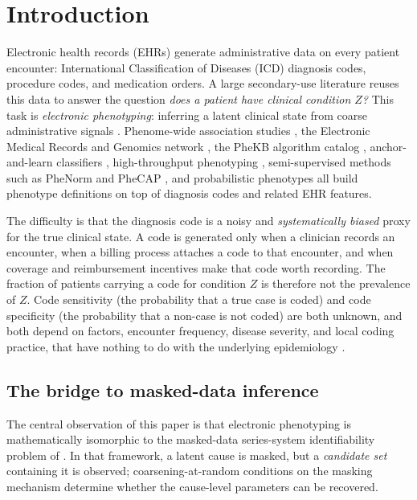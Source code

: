 \section{Introduction}
\label{sec:intro}

Electronic health records (EHRs) generate administrative data on every
patient encounter: International Classification of Diseases (ICD)
diagnosis codes, procedure codes, and medication orders. A large
secondary-use literature reuses this data to answer the question
\emph{does a patient have clinical condition $Z$?} This task is
\emph{electronic phenotyping}: inferring a latent clinical state from
coarse administrative signals \citep{banda2018phenotyping,
hripcsak2013correlating}. Phenome-wide association studies
\citep{denny2010phewas}, the Electronic Medical Records and Genomics
network \citep{gottesman2013emerge,newton2013validation}, the PheKB
algorithm catalog \citep{kirby2016phekb}, anchor-and-learn classifiers
\citep{halpern2016anchor}, high-throughput phenotyping
\citep{liao2015highthroughput}, semi-supervised methods such as
PheNorm \citep{yu2018phenorm} and PheCAP \citep{zhang2019phecap}, and
probabilistic phenotypes \citep{pivovarov2015learning} all build
phenotype definitions on top of diagnosis codes and related EHR
features.

The difficulty is that the diagnosis code is a noisy and
\emph{systematically biased} proxy for the true clinical state. A code
is generated only when a clinician records an encounter, when a billing
process attaches a code to that encounter, and when coverage and
reimbursement incentives make that code worth recording. The fraction
of patients carrying a code for condition $Z$ is therefore not the
prevalence of $Z$. Code sensitivity (the probability that a true case
is coded) and code specificity (the probability that a non-case is not
coded) are both unknown, and both depend on factors, encounter
frequency, disease severity, and local coding practice, that have
nothing to do with the underlying epidemiology
\citep{hripcsak2013correlating,carrell2014surveillance}.

\subsection{The bridge to masked-data inference}

The central observation of this paper is that electronic phenotyping
is mathematically isomorphic to the masked-data series-system
identifiability problem of \citet{towell2026masked}. In that
framework, a latent cause is masked, but a \emph{candidate set}
containing it is observed; coarsening-at-random conditions
\citep{heitjan1991ignorability,gill1997coarsening} on the masking
mechanism determine whether the cause-level parameters can be
recovered.

